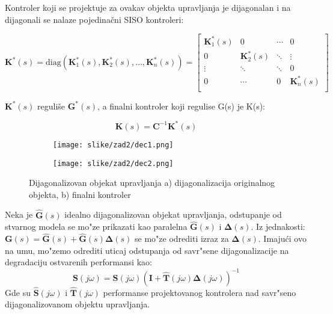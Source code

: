 \documentclass[a4paper,11pt]{article}
\theoremstyle{definition} \newtheorem{deff}{Definicija}[section]
\theoremstyle{definition} \newtheorem{prim}[deff]{Primer}
\theoremstyle{plain} \newtheorem{teor}[deff]{Teorema}
\begin{document}
	Kontroler koji se projektuje za ovakav objekta upravljanja je dijagonalan i na dijagonali se nalaze pojedinačni SISO kontroleri:
	
	\begin{equation}
		\mathbf{K}^*(s) = \text{diag}(\mathbf{K}_1^*(s), \mathbf{K}_2^*(s), \dots, \mathbf{K}_n^*(s)) =
		\begin{bmatrix}
			\mathbf{K}_1^*(s) & 0 & \cdots & 0 \\
			0 & \mathbf{K}_2^*(s) & \ddots & \vdots \\
			\vdots & \ddots & \ddots & 0 \\
			0 & \cdots & 0 & \mathbf{K}_n^*(s) \\
		\end{bmatrix}
	\end{equation}
	
	$\mathbf{K}^*(s)$ reguliše $\mathbf{G}^*(s)$, a finalni kontroler koji regulise G(s) je K(s):
	
	\begin{equation}
		\mathbf{K}(s) = \mathbf{C}^{-1} \mathbf{K}^*(s)
	\end{equation}
	
	\begin{figure}[!h]
		\centering
		\begin{subfigure}[b]{0.45\textwidth}
			\texttt{[image: slike/zad2/dec1.png]}
			\caption{  }
			\label{fig:dec1}
		\end{subfigure}
		\hfill
		\begin{subfigure}[b]{0.45\textwidth}
			\texttt{[image: slike/zad2/dec2.png]}
			\caption{}
			\label{fig:dec2}
		\end{subfigure}
		\hfill
		\caption{ Dijagonalizovan objekat upravljanja 
			a) dijagonalizacija originalnog objekta, b) finalni kontroler}
		
	\end{figure}
	
	Neka je $\hat{\textbf{G}}(s)$ idealno dijagonalizovan objekat upravljanja, odstupanje od stvarnog modela se mo"ze prikazati kao paralelna $\hat{\textbf{G}}(s)$ i $\mathbf{\Delta}(s)$. Iz jednakosti: $\textbf{G}(s) = \hat{\textbf{G}}(s) + \hat{\textbf{G}}(s)\mathbf{\Delta}(s)$ se mo"ze odrediti izraz za $\mathbf{\Delta}(s)$. Imaju\'ci ovo na umu, mo"zemo odrediti uticaj odstupanja od savr"sene dijagonalizacije na degradaciju ostvarenih performansi kao: 
	\begin{equation}\label{eq:degragacija_perf}
		\textbf{S}(j\omega) = \hat{ \textbf{S}}(j\omega)(\textbf{I}+\hat{\textbf{T}}(j\omega)\mathbf{\Delta}(j\omega))^{-1}
	\end{equation}
	Gde su $\hat{ \textbf{S}}(j\omega)$ i $\hat{\textbf{T}}(j\omega)$ performanse projektovanog kontrolera nad savr"seno dijagonalizovanom objektu upravljanja.
	
\end{document}
